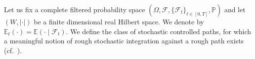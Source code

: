\documentclass[11pt,a4paper]{article}
\newcommand{\E}{\mathbb{E}}
\theoremstyle{plain}
\begin{document}
Let us fix a complete filtered probability space $(\Omega,\mathcal{F},\{\mathcal{F}_t\}_{t \in [0,T]},\mathbb{P})$ and let $(W,|\cdot|)$ be a finite dimensional real Hilbert space.
{ We denote by $\E_t (\cdot) = \E( \cdot \mid \mathcal{F}_t)$.} 
We define the class of stochastic controlled paths, for which a meaningful notion of rough stochastic integration against a rough path exists (cf.\ \cite[Theorem 3.4]{FHL21}).

\end{document}
